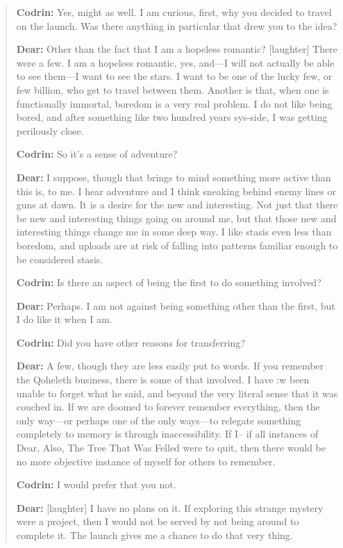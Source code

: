 \begin{quote}
\textbf{Codrin:} Yes, might as well. I am curious, first, why you decided to travel on the launch. Was there anything in particular that drew you to the idea?

\textbf{Dear:} Other than the fact that I am a hopeless romantic? {[}laughter{]} There were a few. I am a hopeless romantic, yes, and---I will not actually be able to see them---I want to see the stars. I want to be one of the lucky few, or few billion, who get to travel between them. Another is that, when one is functionally immortal, boredom is a very real problem. I do not like being bored, and after something like two hundred years sys-side, I was getting perilously close.

\textbf{Codrin:} So it's a sense of adventure?

\textbf{Dear:} I suppose, though that brings to mind something more active than this is, to me. I hear adventure and I think sneaking behind enemy lines or guns at dawn. It is a desire for the new and interesting. Not just that there be new and interesting things going on around me, but that those new and interesting things change me in some deep way. I like stasis even less than boredom, and uploads are at risk of falling into patterns familiar enough to be considered stasis.

\textbf{Codrin:} Is there an aspect of being the first to do something involved?

\textbf{Dear:} Perhaps. I am not against being something other than the first, but I do like it when I am.

\textbf{Codrin:} Did you have other reasons for transferring?

\textbf{Dear:} A few, though they are less easily put to words. If you remember the Qoheleth business, there is some of that involved. I have :w
been unable to forget what he said, and beyond the very literal sense that it was couched in. If we are doomed to forever remember everything, then the only way---or perhaps one of the only ways---to relegate something completely to memory is through inaccessibility. If I-- if all instances of Dear, Also, The Tree That Was Felled were to quit, then there would be no more objective instance of myself for others to remember.

\textbf{Codrin:} I would prefer that you not.

\textbf{Dear:} {[}laughter{]} I have no plans on it. If exploring this strange mystery were a project, then I would not be served by not being around to complete it. The launch gives me a chance to do that very thing.


\end{quote}
